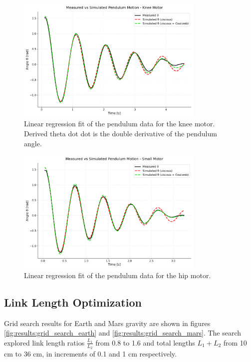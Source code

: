 \begin{figure}[h]
    \centering
    \includegraphics[width=0.8\textwidth]{Images/results/pendulum_large.png}
    \caption{Linear regression fit of the pendulum data for the knee motor. Derived theta dot dot is the double derivative of the pendulum angle.}
    \label{fig:results:motor_friction_estimation:pendulum_large}
\end{figure}

\begin{figure}[h]
    \centering
    \includegraphics[width=0.8\textwidth]{Images/results/pendulum_small.png}
    \caption{Linear regression fit of the pendulum data for the hip motor.}
    \label{fig:results:motor_friction_estimation:pendulum_small}
\end{figure}




\subsection{Link Length Optimization}
\label{sec:results:link_length_optimization}
Grid search results for Earth and Mars gravity are shown in figures \ref{fig:results:grid_search_earth} and \ref{fig:results:grid_search_mars}. The search explored link length ratios \(\frac{L_1}{L_2}\) from 0.8 to 1.6 and total lengths \(L_1 + L_2\) from 10 cm to 36 cm, in increments of 0.1 and 1 cm respectively.

